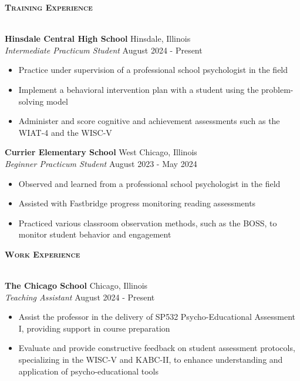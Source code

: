 \documentclass[a4paper]{article}
\newcommand{\lineunder} {
    \vspace*{-8pt} \\
    \hspace*{-18pt} \hrulefill \\
}
\newcommand{\header} [1] {
    {\hspace*{-18pt}\vspace*{6pt} \textsc{#1}}
    \vspace*{-6pt} \lineunder
}
\begin{document}
\vspace{2mm}

\header{\textbf{Training Experience}}
\vspace{1mm}

\textbf{Hinsdale Central High School} 
\hfill Hinsdale, Illinois\\
\textit{Intermediate Practicum Student} \hfill August 2024 - Present\\
    \begin{itemize}[noitemsep]
    \item Practice under supervision of a professional school psychologist in the field
    \item Implement a behavioral intervention plan with a student using the problem-solving model
    \item Administer and score cognitive and achievement assessments such as the WIAT-4 and the WISC-V
        \end{itemize}

\vspace{1mm}

\textbf{Currier Elementary School} 
\hfill West Chicago, Illinois\\
\textit{Beginner Practicum Student} \hfill August 2023 - May 2024\\
    \begin{itemize}[noitemsep]
    \item Observed and learned from a professional school psychologist in the field
    \item Assisted with Fastbridge progress monitoring reading assessments
    \item Practiced various classroom observation methods, such as the BOSS, to monitor student behavior and engagement
    \end{itemize}


\vspace*{1mm}

\header{\textbf{Work Experience}}
\vspace{1mm}

\textbf{The Chicago School} 
\hfill Chicago, Illinois\\
\textit{Teaching Assistant} \hfill August 2024 - Present\\
    \begin{itemize}[noitemsep]
    \item Assist the professor in the delivery of SP532 Psycho-Educational Assessment I, providing support in course preparation
    \item Evaluate and provide constructive feedback on student assessment protocols, specializing in the WISC-V and KABC-II, to enhance understanding and application of psycho-educational tools
    \end{itemize}
\end{document}
